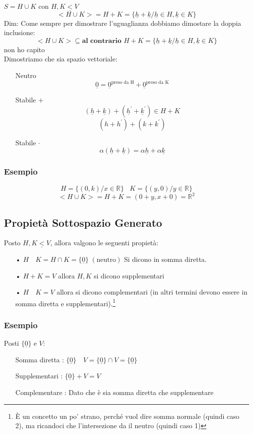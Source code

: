 $ S= H \cup K $ con $H,K \underline{<} V$
$$ <H \cup K> = H+K = \{\underline{h}+\underline{k} / \underline{h} \in H, \underline{k} \in K \} $$
Dim:
Come sempre per dimostrare l'uguaglianza dobbiamo dimostare la doppia inclusione:
$$ <H \cup K> \subseteq \textbf{al contrario } H+K = \{\underline{h}+\underline{k} / \underline{h} \in H, \underline{k} \in K \} $$
non ho capito\\

Dimostriamo che sia spazio vettoriale:
\begin{itemize}
\item[Neutro] $$ \underline{0} = \underline{0}^{\text{preso da H}} + \underline{0}^{\text{preso da K}} $$
\item[Stabile $+$] $$ (\underline{h} + \underline{k}) + (\underline{h}^' + \underline{k}^') \in H+K $$
$$ (h+h^') + (k+k^') $$
\item[Stabile $\cdot$] $$ \alpha(\underline{h}+\underline{k}) = \alpha\underline{h} + \alpha \underline{k}  $$
\end{itemize}

\subsubsection{Esempio}
$$ H=\{(0,k) / x \in \mathbb{R}\} \;\;\; K=\{(y,0) / y \in \mathbb{R} \} $$
$$ <H \cup K> = H+K = (0+y, x+0) = \mathbb{R}^2 $$

\subsection{Propietà Sottospazio Generato}
Posto $H,K \underline{<} V$, allora valgono le seguenti propietà:
\begin{itemize}
\item[•] $ H \quad K = H \cap K = \{ \underline{0} \} \;(\text{neutro}) $ Si dicono in somma diretta.
\item[•] $ H + K = V$ allora $H,K$ si dicono supplementari
\item[•] $ H \quad K = V$ allora si dicono complementari (in altri termini devono essere in somma diretta e supplementari).\footnote{È un concetto un po' strano, perché vuol dire somma normale (quindi caso 2), ma ricandoci che l'intersezione da il neutro (quindi caso 1)}
\end{itemize}

\subsubsection{Esempio}
Posti $\{ \underline{0} \}$ e $V$:
\begin{itemize}
\item[Somma diretta]: $ \{ \underline{0} \} \quad V = \{ \underline{0} \} \cap V = \{ \underline{0} \}$
\item[Supplementari]: $  \{ \underline{0} \} + V = V$
\item[Complementare]: Dato che è sia somma diretta che supplementare
\end{itemize}




